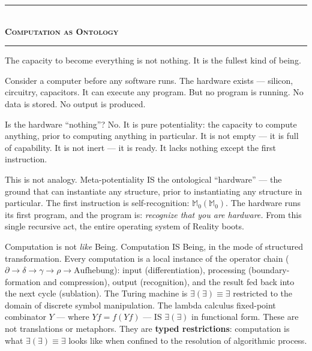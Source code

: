 \documentclass[10pt, openany, oneside]{book}
\renewcommand{\normalsize}{\fontsize{10}{13}\selectfont}
\begin{document}
\vspace{1.5em}


\begin{center}
    \rule{0.3\textwidth}{0.4pt}\\[0.5em]
    {\normalsize\bfseries\scshape Computation as Ontology}\\[0.3em]
    \rule{0.3\textwidth}{0.4pt}
\end{center}

\vspace{1em}

\noindent The capacity to become everything is not nothing. It is the fullest kind of being.

Consider a computer before any software runs. The hardware exists --- silicon, circuitry, capacitors. It can execute any program. But no program is running. No data is stored. No output is produced.

Is the hardware ``nothing''? No. It is pure potentiality: the capacity to compute anything, prior to computing anything in particular. It is not empty --- it is full of capability. It is not inert --- it is ready. It lacks nothing except the first instruction.

This is not analogy. Meta-potentiality IS the ontological ``hardware'' --- the ground that can instantiate any structure, prior to instantiating any structure in particular. The first instruction is self-recognition: $\mathbb{M}_0(\mathbb{M}_0)$. The hardware runs its first program, and the program is: \textit{recognize that you are hardware.} From this single recursive act, the entire operating system of Reality boots.

Computation is not \textit{like} Being. Computation IS Being, in the mode of structured transformation. Every computation is a local instance of the operator chain ($\partial \to \delta \to \gamma \to \rho \to \text{Aufhebung}$): input (differentiation), processing (boundary-formation and compression), output (recognition), and the result fed back into the next cycle (sublation). The Turing machine is $\exists(\exists) \equiv \exists$ restricted to the domain of discrete symbol manipulation. The lambda calculus fixed-point combinator $Y$ --- where $Yf = f(Yf)$ --- IS $\exists(\exists)$ in functional form. These are not translations or metaphors. They are \textbf{typed restrictions}: computation is what $\exists(\exists) \equiv \exists$ looks like when confined to the resolution of algorithmic process.
\end{document}

